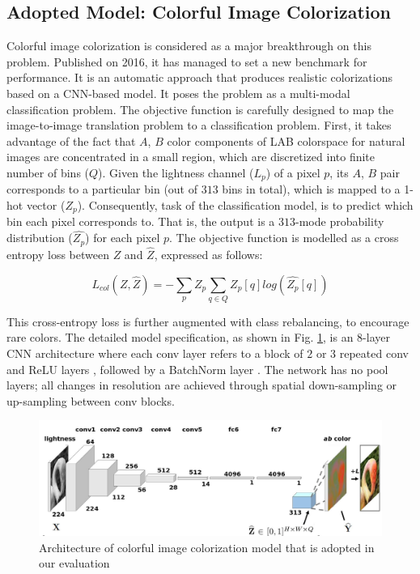\documentclass[10pt]{article}
\begin{document}
\subsection{\textbf{Adopted Model: Colorful Image Colorization}}
Colorful image colorization \cite{zhang2016colorful} is considered as a major breakthrough on this problem. Published on 2016, it has managed to set a new benchmark for performance. It is an automatic approach that produces realistic colorizations based on a CNN-based model. 
It poses the problem as a multi-modal classification problem. The objective function is carefully designed to map the image-to-image translation problem to a classification problem. First, it takes advantage of the fact that $A$, $B$ color components of LAB colorspace for natural images are concentrated in a small region, which are discretized into finite number of bins ($Q$). 
Given the lightness channel ($L_p$) of a pixel $p$, its $A$, $B$ pair corresponds to a particular bin (out of $313$ bins in total), which is mapped to a 1-hot vector ($Z_p$). 
Consequently, task of the classification model, is to predict which bin each pixel corresponds to. That is, the output is a $313$-mode probability distribution ($ \hat{Z_p}$) for each pixel $p$. The objective function is modelled as a cross entropy loss between $Z$ and $\hat{Z}$, expressed as follows: 

\[ L_{col}(Z, \hat{Z}) = - \sum_p Z_p \sum_{q \in Q} Z_p[q] log(\hat{Z_p}[q])   \] 

This cross-entropy loss is further augmented with class rebalancing, to encourage rare colors. The detailed model specification, as shown in Fig. \ref{fig:col_main}, is an 8-layer CNN architecture where each conv layer refers to a block of $2$ or $3$ repeated
conv and ReLU layers \cite{nair2010rectified}, followed by a BatchNorm layer \cite{ioffe2015batch}. The network has no pool layers; 
all changes in resolution are achieved through spatial down-sampling or up-sampling between conv blocks.


\begin{figure}[h]
\centering
\includegraphics[width=0.8 \linewidth]{Figs/one.jpg} 
\caption{Architecture of colorful image colorization model \cite{zhang2016colorful} that is adopted in our evaluation}
\label{fig:col_main}
\end{figure}  
\end{document}
